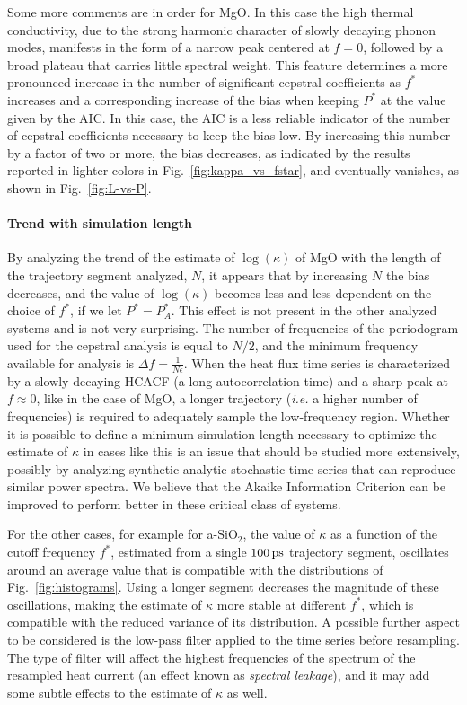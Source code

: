 Some more comments are in order for MgO. In this case the high thermal conductivity, due to the strong harmonic character of slowly decaying phonon modes, manifests in the form of a narrow peak centered at $f=0$, followed by a broad plateau that carries little spectral weight. This feature determines a more pronounced increase in the number of significant cepstral coefficients as $f^*$ increases and a corresponding increase of the bias when keeping $P^*$ at the value given by the AIC. In this case, the AIC is a less reliable indicator of the number of cepstral coefficients necessary to keep the bias low. By increasing this number by a factor of two or more, the bias decreases, as indicated by the results reported in lighter colors in Fig.~\ref{fig:kappa_vs_fstar}, and eventually vanishes, as shown in Fig.~\ref{fig:L-vs-P}.

\begin{LEtext}
\paragraph{Trend with simulation length}
By analyzing the trend of the estimate of $\log(\kappa)$ of MgO with the length of the trajectory segment analyzed, $N$, it appears that by increasing $N$ the bias decreases, and the value of $\log(\kappa)$ becomes less and less dependent on the choice of $f^*$, if we let $P^*=P_A^*$. This effect is not present in the other analyzed systems and is not very surprising. The number of frequencies of the periodogram used for the cepstral analysis is equal to $N/2$, and the minimum frequency available for analysis is $\Delta f = \frac{1}{N\epsilon}$. 
When the heat flux time series is characterized by a slowly decaying HCACF (a long autocorrelation time) and a sharp peak at $f\approx 0$, like in the case of MgO, a longer trajectory (\emph{i.e.} a higher number of frequencies) is required to adequately sample the low-frequency region. 
Whether it is possible to define a minimum simulation length necessary to optimize the estimate of $\kappa$ in cases like this is an issue that should be studied more extensively, possibly by analyzing synthetic analytic stochastic time series that can reproduce similar power spectra. 
We believe that the Akaike Information Criterion can be improved to perform better in these critical class of systems. 

For the other cases, for example for a-SiO$_2$, the value of $\kappa$ as a function of the cutoff frequency $f^*$, estimated from a single $100\,\mathrm{ps}$ trajectory segment, oscillates around an average value that is compatible with the distributions of Fig.~\ref{fig:histograms}. Using a longer segment decreases the magnitude of these oscillations, making the estimate of $\kappa$ more stable at different $f^*$, which is compatible with the reduced variance of its distribution. 
A possible further aspect to be considered is the low-pass filter applied to the time series before resampling. The type of filter will affect the highest frequencies of the spectrum of the resampled heat current (an effect known as \emph{spectral leakage}), and it may add some subtle effects to the estimate of $\kappa$ as well. 
\end{LEtext}


